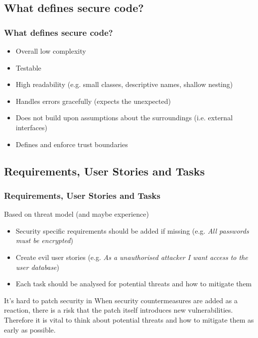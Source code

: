 \documentclass{beamer}
\begin{document}
  \subsection{What defines secure code?} %
    \begin{frame}
      \frametitle{What defines secure code?}
      \begin{itemize}
        \item Overall low complexity
        \item Testable
        \item High readability (e.g. small classes, descriptive names, shallow nesting)
        \item Handles errors gracefully (expects the unexpected)
        \item Does not build upon assumptions about the surroundings (i.e. external interfaces)
        \item Defines and enforce trust boundaries
      \end{itemize}
    \end{frame}

  \subsection{Requirements, User Stories and Tasks}
    \begin{frame}
      \frametitle{Requirements, User Stories and Tasks}
      Based on threat model (and maybe experience)
      \begin{itemize}
        \item Security specific requirements should be added if missing (e.g. \textit{All passwords must be encrypted})
        \item Create evil user stories (e.g. \textit{As a unauthorised attacker I want access to the user database})
        \item Each task should be analysed for potential threats and how to mitigate them
      \end{itemize}
      \begin{block}{It's hard to patch security in}
        When security countermeasures are added as a reaction, there is a risk that the patch itself introduces new vulnerabilities.
        Therefore it is vital to think about potential threats and how to mitigate them as early as possible.
      \end{block}
    \end{frame}
\end{document}
